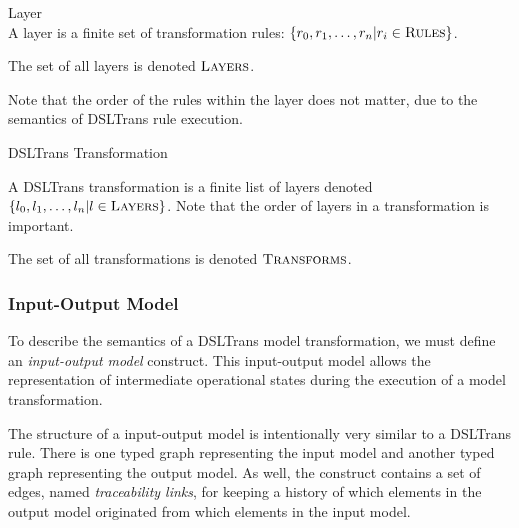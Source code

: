 \begin{definition}{Layer\\}
\label{def:layer}
A layer is a finite set of transformation rules: $\{r_0, r_1, \dots, r_n | r_i \in \textsc{Rules}\}$.

The set of all layers is denoted $\textsc{Layers}$. 
\end{definition}

Note that the order of the rules within the layer does not matter, due to the semantics of DSLTrans rule execution.

\begin{definition}{DSLTrans Transformation\\}
\label{def:transformation}

A DSLTrans transformation is a finite list of layers denoted $\{l_0, l_1, \dots, l_n | l \in \textsc{Layers}\}$. Note that the order of layers in a transformation is important.

The set of all transformations is denoted $\textsc{Transforms}$.



\end{definition}



\subsubsection*{Input-Output Model}

To describe the semantics of a DSLTrans model transformation, we must define an \textit{input-output model} construct. This input-output model allows the representation of intermediate operational states during the execution of a model transformation.

The structure of a input-output model is intentionally very similar to a DSLTrans rule. There is one typed graph representing the input model and another typed graph representing the output model. As well, the construct contains a set of edges, named \emph{traceability links}, for keeping a history of which elements in the output model originated from which elements in the input model.


